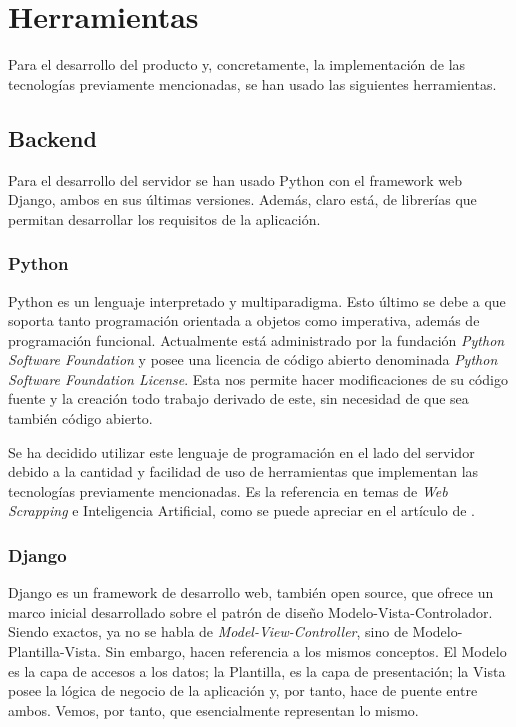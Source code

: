\section{Herramientas}\label{sec:herramientas}

Para el desarrollo del producto y, concretamente, la implementación de las tecnologías previamente mencionadas, se han usado las siguientes herramientas.

\subsection{Backend}
Para el desarrollo del servidor se han usado Python con el framework web Django, ambos en sus últimas versiones. Además, claro está, de librerías que permitan desarrollar los requisitos de la aplicación.

\subsubsection{Python}
Python es un lenguaje interpretado y multiparadigma. Esto último se debe a que soporta tanto programación orientada a objetos como imperativa, además de programación funcional. Actualmente está administrado por la fundación \textit{Python Software Foundation} y posee una licencia de código abierto denominada \textit{Python Software Foundation License}. Esta nos permite hacer modificaciones de su código fuente y la creación todo trabajo derivado de este, sin necesidad de que sea también código abierto.

Se ha decidido utilizar este lenguaje de programación en el lado del servidor debido a la cantidad y facilidad de uso de herramientas que implementan las tecnologías previamente mencionadas. Es la referencia en temas de \textit{Web Scrapping} e Inteligencia Artificial, como se puede apreciar en el artículo de .

\subsubsection{Django}
Django es un framework de desarrollo web, también open source, que ofrece un marco inicial desarrollado sobre el patrón de diseño Modelo-Vista-Controlador. Siendo exactos, ya no se habla de \textit{Model-View-Controller}, sino de Modelo-Plantilla-Vista. Sin embargo, hacen referencia a los mismos conceptos. El Modelo es la capa de accesos a los datos; la Plantilla, es la capa de presentación; la Vista posee la lógica de negocio de la aplicación y, por tanto, hace de puente entre ambos. Vemos, por tanto, que esencialmente representan lo mismo.

